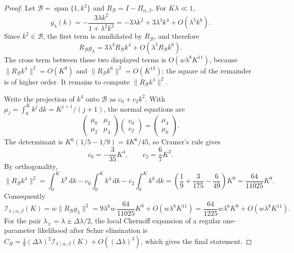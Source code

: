 \documentclass[10pt,a4paper]{amsart}
\newcommand{\calB}{\mathcal B}
\newcommand{\calI}{\mathcal I}
\newcommand{\dd}{\mathrm{d}}
\begin{document}
\begin{proof}
Let \(\calB=\operatorname{span}\{1,k^2\}\) and \(R_\calB=I-\Pi_{\alpha,\beta}\). For \(K\lambda\ll1\),
\[
g_\lambda(k)=-\frac{3\lambda k^2}{1+\lambda^2k^2}
=-3\lambda k^2+3\lambda^3k^4+O(\lambda^5k^6).
\]
Since \(k^2\in\calB\), the first term is annihilated by \(R_\calB\), and therefore
\[
R_\calB g_\lambda=3\lambda^3R_\calB k^4+O(\lambda^5R_\calB k^6).
\]
The cross term between these two displayed terms is \(O(w\lambda^8K^{11})\), because \(\|R_\calB k^4\|^2=O(K^9)\) and \(\|R_\calB k^6\|^2=O(K^{13})\); the square of the remainder is of higher order. It remains to compute \(\|R_\calB k^4\|^2\).

Write the projection of \(k^4\) onto \(\calB\) as \(c_0+c_2k^2\). With \(\mu_j=\int_0^Kk^j\,\dd k=K^{j+1}/(j+1)\), the normal equations are
\[
\begin{pmatrix}
\mu_0&\mu_2\\
\mu_2&\mu_4
\end{pmatrix}
\begin{pmatrix}c_0\\c_2\end{pmatrix}
=
\begin{pmatrix}\mu_4\\\mu_6\end{pmatrix}.
\]
The determinant is \(K^6(1/5-1/9)=4K^6/45\), so Cramer's rule gives
\[
c_0=-\frac{3}{35}K^4,\qquad c_2=\frac67K^2 .
\]
By orthogonality,
\[
\|R_\calB k^4\|^2
=\int_0^Kk^8\,\dd k-c_0\int_0^Kk^4\,\dd k-c_2\int_0^Kk^6\,\dd k
=\left(\frac19+\frac{3}{175}-\frac{6}{49}\right)K^9
=\frac{64}{11025}K^9 .
\]
Consequently
\[
\calI_{\lambda\mid\alpha,\beta}(K)
=w\|R_\calB g_\lambda\|^2
=9\lambda^6w\,\frac{64}{11025}K^9+O(w\lambda^8K^{11})
=\frac{64}{1225}w\lambda^6K^9+O(w\lambda^8K^{11}).
\]
For the pair \(\lambda_\pm=\lambda\pm\Delta\lambda/2\), the local Chernoff expansion of a regular one-parameter likelihood after Schur elimination is \(C_R=\tfrac18(\Delta\lambda)^2\calI_{\lambda\mid\alpha,\beta}(K)+O((\Delta\lambda)^3)\), which gives the final statement.
\end{proof}
\end{document}
